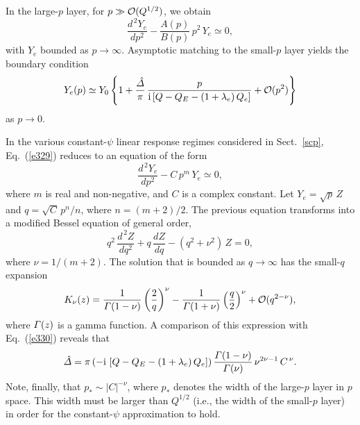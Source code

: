 \documentclass[12pt,prb,aps]{revtex4-1}
\begin{document}
In the large-$p$ layer, for  $p\gg {\cal O}(Q^{1/2})$, we obtain 
\begin{equation}\label{e329}
\frac{d^{\,2} Y_e}{dp^2} - \frac{A(p)}{B(p)}\,p^2\,Y_e\simeq 0,
\end{equation}
with $Y_e$ bounded as $p\rightarrow \infty$. Asymptotic matching to the small-$p$ layer yields the boundary
condition 
\begin{equation}\label{e330}
Y_e(p)\simeq Y_0\left\{1+ \frac{\hat{\mit\Delta}}{\pi}\,\frac{p}{{\rm i}\,[Q-Q_E-(1+\lambda_e)\,Q_e]}+ {\cal O}(p^2)\right\}
\end{equation}
as $p\rightarrow 0$. 

In the various constant-$\psi$ linear response regimes considered in Sect.~\ref{scp}, Eq.~(\ref{e329}) reduces to an
equation of the form
\begin{equation}\label{e330a}
\frac{d^{\,2}Y_e}{dp^2}- C\,p^m\,Y_e\simeq 0,
\end{equation}
where $m$ is real and non-negative, and $C$ is a complex constant. Let $Y_e=\sqrt{p}\,Z$ and $q=\sqrt{C}\,p^n/n$, where
$n=(m+2)/2$. The previous equation transforms into a modified Bessel equation of general order, 
\begin{equation}
q^2\,\frac{d^{\,2}Z}{dq^2} + q\,\frac{dZ}{dq} - (q^2+\nu^2)\,Z =0,
\end{equation}
where $\nu=1/(m+2)$. The solution that is bounded as $q\rightarrow \infty$ has the small-$q$
expansion
\begin{equation}\label{e332}
K_\nu(z)= \frac{1}{{\mit\Gamma}(1-\nu)}\left(\frac{2}{q}\right)^\nu - \frac{1}{{\mit\Gamma}(1+\nu)}\left(\frac{q}{2}\right)^\nu + {\cal O}(q^{2-\nu}),
\end{equation}
where ${\mit\Gamma}(z)$ is a gamma function. 
A comparison of this expression with Eq.~(\ref{e330}) reveals that
\begin{equation}
\hat{\mit\Delta} = \pi\,(-{\rm i}\,\left[Q-Q_E-(1+\lambda_e)\,Q_e\right])\, \frac{{\mit\Gamma}(1-\nu)}{{\mit\Gamma}(\nu)}\,\nu^{2\nu-1}\,C^{\,\nu}.
\end{equation}
Note, finally, that $p_\ast\sim |C|^{-\nu}$, where $p_\ast$ denotes the width of the large-$p$ layer in $p$ space. This width must be larger than $Q^{1/2}$ (i.e., the width of the small-$p$ layer) in order for the constant-$\psi$ approximation to hold. 
\end{document}

